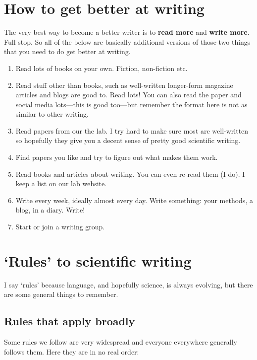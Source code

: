\documentclass[11pt,letter]{article}
\begin{document}
\section{How to get better at writing}

The very best way to become a better writer is to {\bf read more} and {\bf write more}. Full stop. So all of the below are basically additional versions of those two things that you need to do get better at writing. 
\begin{enumerate}
\item Read lots of books on your own. Fiction, non-fiction etc. 
\item Read stuff other than books, such as well-written longer-form magazine articles and blogs are good to. Read lots! You can also read the paper and social media lots---this is good too---but remember the format here is not as similar to other writing. 
\item Read papers from our the lab. I try hard to make sure most are well-written so hopefully they give you a decent sense of pretty good scientific writing.
\item Find papers you like and try to figure out what makes them work. 
\item Read books and articles about writing. You can even re-read them (I do). I keep a list on our lab website.
\item Write every week, ideally almost every day. Write something: your methods, a blog, in a diary. Write!
\item Start or join a writing group. 
\end{enumerate}


\section{`Rules' to scientific writing}
I say `rules' because language, and hopefully science, is always evolving, but there are some general things to remember. 

\subsection{Rules that apply broadly}
Some rules we follow are very widespread and everyone everywhere generally follows them. Here they are in no real order:
\end{document}
